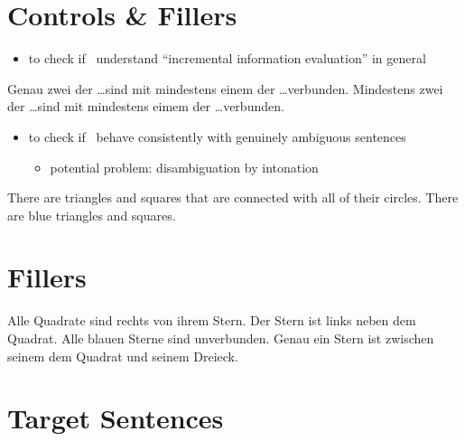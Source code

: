 \documentclass[fleqn,reqno,10pt]{article}
\begin{document}
\section{Controls \& Fillers}

\begin{itemize}
\item to check if \ understand ``incremental information
  evaluation'' in general
\end{itemize}

\medskip

\begin{exe}
  \ex Genau zwei der \dots sind mit mindestens einem der \dots verbunden.
  \ex Mindestens zwei der \dots sind mit mindestens eimem der \dots verbunden.
\end{exe}

\begin{itemize}
\item to check if \ behave consistently with genuinely
  ambiguous sentences
  \begin{itemize}
  \item potential problem: disambiguation by intonation
  \end{itemize}
\end{itemize}

\medskip

\begin{exe}
  \ex There are triangles and squares that are connected with all of
    their circles.
  \ex There are blue triangles and squares.
\end{exe}


\section{Fillers}

\begin{exe}
  \ex Alle Quadrate sind rechts von ihrem Stern.
  \ex Der Stern ist links neben dem Quadrat.
  \ex Alle blauen Sterne sind unverbunden.
  \ex Genau ein Stern ist zwischen seinem dem Quadrat und seinem
    Dreieck. 
\end{exe}

\newpage

\appendix

\section{Target Sentences}
\label{sec:target-sentences}
\end{document}
